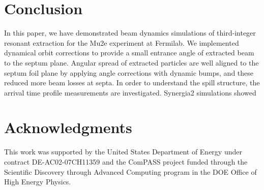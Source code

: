 \documentclass[aps,prstab,onecolumn,preprint,endfloats,11pt]{revtex4-1}
\begin{document}
\section{\label{sec:conclusion}Conclusion}

In this paper, we have demonstrated beam dynamics simulations of third-integer resonant extraction for the Mu2e experiment at Fermilab. We implemented dynamical orbit corrections to provide a small entrance angle of extracted beam to the septum plane. Angular spread of extracted particles are well aligned to the septum foil plane by applying angle corrections with dynamic bumps, and these reduced more beam losses at septa. In order to understand the spill structure, the arrival time profile measurements are investigated. Synergia2 simulations showed 









\section{\label{thanks}Acknowledgments}

This work was supported by the United States Department of Energy under contract DE-AC02-07CH11359 and the ComPASS project funded through the Scientific Discovery through Advanced Computing program in the DOE Office of High Energy Physics.
\end{document}
